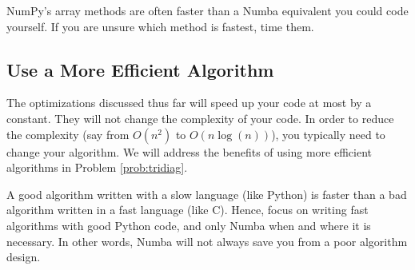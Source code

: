 \begin{warn}
NumPy's array methods are often faster than a Numba equivalent you could code yourself.
If you are unsure which method is fastest, time them.
\end{warn}



\subsection*{Use a More Efficient Algorithm}

The optimizations discussed thus far will speed up your code at most by a constant.
They will not change the complexity of your code.
In order to reduce the complexity (say from $O(n^2)$ to $O(n \log(n))$), you typically need to change your algorithm.
We will address the benefits of using more efficient algorithms in Problem \ref{prob:tridiag}.

A good algorithm written with a slow language (like Python) is faster than a bad algorithm written in a fast language (like C).
Hence, focus on writing fast algorithms with good Python code, and only Numba when and where it is necessary. In other words, Numba will not always save you from a poor algorithm design.


\begin{comment}
\begin{problem}
Optimize the following function using techniques described in this lab:
\begin{lstlisting}
# TODO: COME UP WITH SOME ALGORITHM TO DO HERE!!
\end{lstlisting}
It should also include a list of changes, the reasoning behind the changes, and the effect of the changes on runtime. On the author's computer, computing the LU-decomposition on a 1000x1000 matrix took over 2 and a half minutes. The optimized version took a little over a second.

Hint: The best way to approach this problem is to analyze what each piece of code is actually doing. Then, determine if there is a more efficient way to accomplish the same task. Specifically, look for ways to use array operations instead of for loops, ways to replace blocks of code with built-in Python functions, and ways to avoid recomputing values.
\end{problem}
\end{comment}

